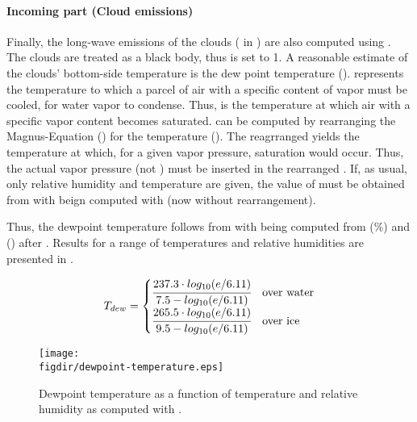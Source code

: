 \paragraph{Incoming part (Cloud emissions)}
Finally, the long-wave emissions of the clouds (\radLongwaveInClouds{} in ) are also computed using . The clouds are treated as a black body, thus \emissivity{} is set to 1. A reasonable estimate of the clouds' bottom-side temperature is the dew point temperature \dewpointTemperature{} (\celsius). \dewpointTemperature{} represents the temperature to which a parcel of air with a specific content of vapor must be cooled, for water vapor to condense. Thus, \dewpointTemperature{} is the temperature at which air with a specific vapor content becomes saturated. \dewpointTemperature{} can be computed by rearranging the Magnus-Equation () for the temperature \temperature{} (). The reagrranged  yields the temperature at which, for a given vapor pressure, saturation would occur. Thus, the actual vapor pressure \vaporPressure{} (not \satVaporPressure{}) must be inserted in the rearranged . If, as usual, only relative humidity and temperature are given, the value of \vaporPressure{} must be obtained from  with \satVaporPressure{} beign computed with  (now without rearrangement).

Thus, the dewpoint temperature \dewpointTemperature{} follows from  with \vaporPressure{} being computed from \relHumidity{} (\%) and \airtemp{} (\celsius) after . Results for a range of temperatures and relative humidities are presented in .

\begin{equation} \label{eqn:dewpointTemperature}
  T_{dew} =
  \begin{cases}
  \cfrac{237.3 \cdot log_{10}(e/6.11)}{7.5 - log_{10}(e/6.11)} & \text{over water} \\
  \cfrac{265.5 \cdot log_{10}(e/6.11)}{9.5 - log_{10}(e/6.11)} & \text{over ice} \\
  \end{cases}
\end{equation}

\begin{figure}[htb]
  \centering
  \texttt{[image: \\figdir/dewpoint-temperature.eps]}
  \caption[Dewpoint temperature as a function of temperature and relative humidity.]{Dewpoint temperature as a function of temperature and relative humidity as computed with . \label{fig:dewpointTemperature}}
\end{figure}

